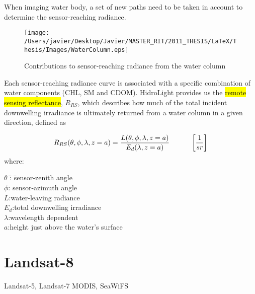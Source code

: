 When imaging water body, a set of new paths need to be taken in account to determine the sensor-reaching radiance.
 \begin{figure}[htb]
  \centering
      \texttt{[image: /Users/javier/Desktop/Javier/MASTER\_RIT/2011\_THESIS/LaTeX/Thesis/Images/WaterColumn.eps]}
  \caption{Contributions to sensor-reaching radiance from the water column \label{fig:WaterColumn}}
  \end{figure}


Each sensor-reaching radiance curve is associated with a specific combination of water components (CHL, SM and CDOM). HidroLight provides us the \hl{remote sensing reflectance}, $R_{RS}$, which describes how much of the total incident downwelling irradiance is ultimately returned from a water column in a given direction, defined as

\begin{equation} \label{eq:Rrs}
R_{RS}(\theta,\phi,\lambda,z=a) = \frac{L(\theta,\phi,\lambda,z=a)}{E_d(\lambda,z=a)}   \indent   \indent  \left[\frac{1}{sr}\right]  
\end{equation} 
where:
\begin{tabbing}
\indent \indent \indent  $\theta$ \hspace{1.5mm}\=:  \indent \= sensor-zenith angle\\
\indent \indent \indent  $\phi$\>: \>sensor-azimuth angle\\
\indent \indent \indent $L$\>:\>water-leaving radiance\\
\indent \indent \indent $E_d$\>:\>total downwelling irradiance\\
\indent \indent \indent $\lambda$\>:\>wavelength dependent\\
\indent \indent \indent $a$\>:\>height just above the water's surface\\
\end{tabbing}


\section{ Landsat-8}
Landsat-5, Landsat-7
MODIS, SeaWiFS


